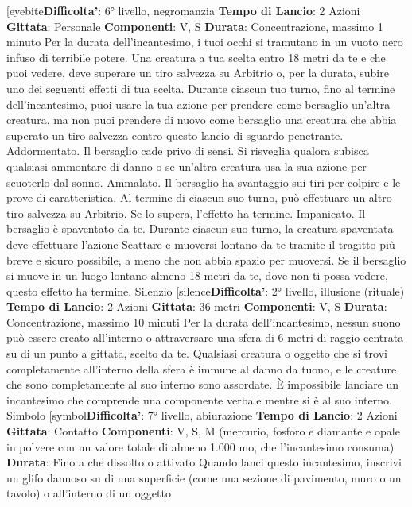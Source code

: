 \begin{multicols}{2}
[eyebite\textbf{Difficolta'}:
6° livello, negromanzia
\textbf{Tempo di Lancio}: 2 Azioni
\textbf{Gittata}: Personale
\textbf{Componenti}: V, S
\textbf{Durata}: Concentrazione, massimo 1 minuto
Per la durata dell’incantesimo, i tuoi occhi si tramutano
in un vuoto nero infuso di terribile potere. Una creatura
a tua scelta entro 18 metri da te e che puoi vedere,
deve superare un tiro salvezza su Arbitrio o, per la
durata, subire uno dei seguenti effetti di tua scelta.
Durante ciascun tuo turno, fino al termine
dell’incantesimo, puoi usare la tua azione per prendere
come bersaglio un’altra creatura, ma non puoi prendere
di nuovo come bersaglio una creatura che abbia
superato un tiro salvezza contro questo lancio di
sguardo penetrante.
Addormentato. Il bersaglio cade privo di sensi. Si
risveglia qualora subisca qualsiasi ammontare di danno
o se un’altra creatura usa la sua azione per scuoterlo
dal sonno.
Ammalato. Il bersaglio ha svantaggio sui tiri per colpire
e le prove di caratteristica. Al termine di ciascun suo
turno, può effettuare un altro tiro salvezza su Arbitrio.
Se lo supera, l’effetto ha termine.
Impanicato. Il bersaglio è spaventato da te. Durante
ciascun suo turno, la creatura spaventata deve
effettuare l’azione Scattare e muoversi lontano da te
tramite il tragitto più breve e sicuro possibile, a meno
che non abbia spazio per muoversi. Se il bersaglio si
muove in un luogo lontano almeno 18 metri da te, dove
non ti possa vedere, questo effetto ha termine.
Silenzio
[silence\textbf{Difficolta'}:
2° livello, illusione (rituale)
\textbf{Tempo di Lancio}: 2 Azioni
\textbf{Gittata}: 36 metri
\textbf{Componenti}: V, S
\textbf{Durata}: Concentrazione, massimo 10 minuti
Per la durata dell’incantesimo, nessun suono può
essere creato all’interno o attraversare una sfera di 6
metri di raggio centrata su di un punto a gittata, scelto
da te. Qualsiasi creatura o oggetto che si trovi
completamente all’interno della sfera è immune al
danno da tuono, e le creature che sono completamente
al suo interno sono assordate. È impossibile lanciare un
incantesimo che comprende una componente verbale
mentre si è al suo interno.
Simbolo
[symbol\textbf{Difficolta'}:
7° livello, abiurazione
\textbf{Tempo di Lancio}: 2 Azioni
\textbf{Gittata}: Contatto
\textbf{Componenti}: V, S, M (mercurio, fosforo e diamante e
opale in polvere con un valore totale di almeno 1.000
mo, che l’incantesimo consuma)
\textbf{Durata}: Fino a che dissolto o attivato
Quando lanci questo incantesimo, inscrivi un glifo
dannoso su di una superficie (come una sezione di
pavimento, muro o un tavolo) o all’interno di un oggetto

\end{multicols}
